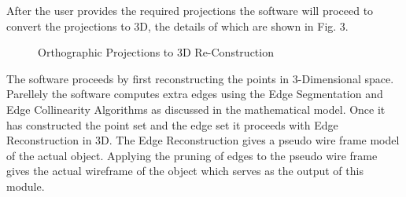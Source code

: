 \documentclass[a4paper,12pt,openany]{report}
\begin{document}
After the user provides the required projections the software will proceed to convert the projections to 3D, the details of which are shown in Fig. 3.
\begin{figure}[h]
	\centering
	\caption{Orthographic Projections to 3D Re-Construction}
\end{figure}

The software proceeds by first reconstructing the points in 3-Dimensional space. Parellely the software computes extra edges using the Edge Segmentation and Edge Collinearity Algorithms as discussed in the mathematical model. Once it has constructed the point set and the edge set it proceeds with Edge Reconstruction in 3D. The Edge Reconstruction gives a pseudo wire frame model of the actual object. Applying the pruning of edges to the pseudo wire frame gives the actual wireframe of the object which serves as the output of this module.
\end{document}
